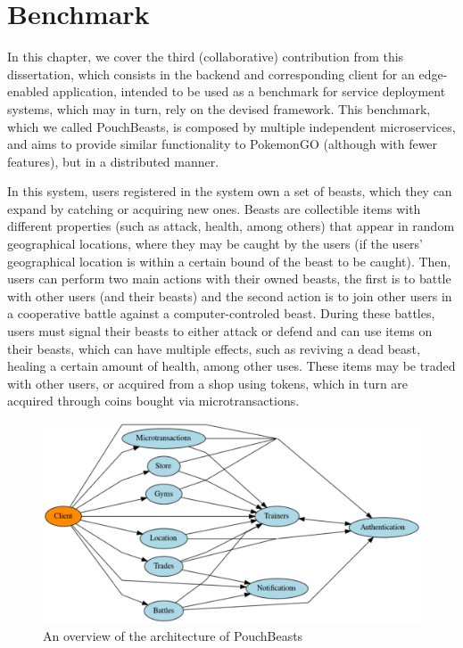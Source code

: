 

\chapter{Benchmark}
\label{cha:benchmark}

In this chapter, we cover the third (collaborative) contribution from this dissertation, which consists in the backend and corresponding client for an edge-enabled application, intended to be used as a benchmark for service deployment systems, which may in turn, rely on the devised framework. This benchmark, which we called PouchBeasts, is composed by multiple independent microservices, and aims to provide similar functionality to PokemonGO  (although with fewer features), but in a distributed manner.

In this system, users registered in the system own a set of beasts, which they can expand by catching or acquiring new ones. Beasts are collectible items with different properties (such as attack, health, among others) that appear in random geographical locations, where they may be caught by the users (if the users' geographical location is within a certain bound of the beast to be caught). Then, users can perform two main actions with their owned beasts, the first is to battle with other users (and their beasts) and the second action is to join other users in a cooperative battle against a computer-controled beast. During these battles, users must signal their beasts to either attack or defend and can use items on their beasts, which can have multiple effects, such as reviving a dead beast, healing a certain amount of health, among other uses. These items may be traded with other users, or acquired from a shop using tokens, which in turn are acquired through coins bought via microtransactions.

\begin{figure}[htbp]
    \centering
    \includegraphics[width=\textwidth]{Chapters/benchmark/figures/interaction-diagram.pdf}
    \caption{An overview of the architecture of PouchBeasts}
    \label{fig:pouchbeasts-overview}
\end{figure}

